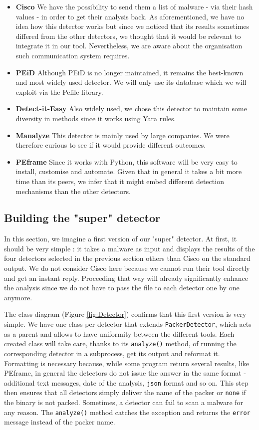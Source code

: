 \begin{itemize}
    \item \textbf{Cisco} We have the possibility to send them a list of malware - via their hash values - in order to get their analysis back. As aforementioned, we have no idea how this detector works but since we noticed that its results sometimes differed from the other detectors, we thought that it would be relevant to integrate it in our tool. Nevertheless, we are aware about the organisation such communication system requires. 
    \item \textbf{PEiD} \cite{peid} Although PEiD is no longer maintained, it remains the best-known and most widely used detector. We will only use its database which we will exploit via the Pefile library.
    \item \textbf{Detect-it-Easy} \cite{die} Also widely used, we chose this detector to maintain some diversity in methods since it works using Yara rules.
    \item \textbf{Manalyze} \cite{manalyze} This detector is mainly used by large companies. We were therefore curious to see if it would provide different outcomes.
    \item \textbf{PEframe} \cite{peframe} Since it works with Python, this software will be very easy to install, customise and automate. Given that in general it takes a bit more time than its peers, we infer that it might embed different detection mechanisms than the other detectors.
\end{itemize}

\subsection{Building the "super" detector}

In this section, we imagine a first version of our "super" detector. At first, it should be very simple : it takes a malware as input and displays the results of the four detectors selected in the previous section others than Cisco on the standard output. We do not consider Cisco here because we cannot run their tool directly and get an instant reply. Proceeding that way will already significantly enhance the analysis since we do not have to pass the file to each detector one by one anymore.

The class diagram (Figure \ref{fig:Detector}) confirms that this first version is very simple. We have one class per detector that extends \texttt{PackerDetector}, which acts as a parent and allows to have uniformity between the different tools. Each created class will take care, thanks to its \texttt{analyze()} method, of running the corresponding detector in a subprocess, get its output and reformat it. Formatting is necessary because, while some program return several results, like PEframe, in general the detectors do not issue the answer in the same format - additional text messages, date of the analysis, \texttt{json} format and so on. This step then ensures that all detectors simply deliver the name of the packer or \texttt{none} if the binary is not packed. Sometimes, a detector can fail to scan a malware for any reason. The \texttt{analyze()} method catches the exception and returns the \texttt{error} message instead of the packer name. 

